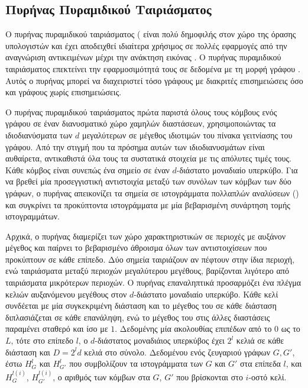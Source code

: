 \subsection{Πυρήνας Πυραμιδικού Ταιριάσματος}
\label{ssec:pm}
Ο πυρήνας πυραμιδικού ταιριάσματος ( είναι πολύ δημοφιλής στον χώρο της όρασης υπολογιστών και έχει αποδειχθεί ιδιαίτερα χρήσιμος σε πολλές εφαρμογές από την αναγνώριση αντικειμένων μέχρι την ανάκτηση εικόνας \cite{grauman2007pyramid,lazebnik2006beyond}.
Ο πυρήνας πυραμιδικού ταιριάσματος επεκτείνει την εφαρμοσιμότητά τους σε δεδομένα με τη μορφή γράφου \cite{nikolentzos2017matching}.
Αυτός ο πυρήνας μπορεί να διαχειριστεί τόσο γράφους με διακριτές επισημειώσεις όσο και γράφους χωρίς επισημειώσεις.\par
Ο πυρήνας πυραμιδικού ταιριάσματος πρώτα παριστά όλους τους κόμβους ενός γράφου σε έναν διανυσματικό χώρο χαμηλών διαστάσεων, χρησιμοποιώντας τα ιδιοδιανύσματα των $d$ μεγαλύτερων σε μέγεθος ιδιοτιμών του πίνακα γειτνίασης του γράφου.
Από την στιγμή που τα πρόσημα αυτών των ιδιοδιανυσμάτων είναι αυθαίρετα, αντικαθιστά όλα τους τα συστατικά στοιχεία με τις απόλυτες τιμές τους.
Κάθε κόμβος είναι συνεπώς ένα σημείο σε έναν $d$-διάστατο μοναδιαίο υπερκύβο.
Για να βρεθεί μία προσεγγιστική αντιστοιχία μεταξύ των συνόλων των κόμβων των δύο γράφων, ο πυρήνας απεικονίζει τα σημεία σε ιστογράμματα πολλαπλών αναλύσεων () και συγκρίνει τα προκύπτοντα ιστογράμματα με μία βεβαρισμένη συνάρτηση τομής ιστογραμμάτων.\par
Αρχικά, ο πυρήνας διαμερίζει των χώρο χαρακτηριστικών σε περιοχές με αυξάνον μέγεθος και παίρνει το βεβαρισμένο άθροισμα όλων των αντιστοιχίσεων που προκύπτουν σε κάθε επίπεδο.
Δύο σημεία ταιριάζουν αν πέφτουν στην ίδια περιοχή, ενώ ταιριάσματα μεταξύ περιοχών μεγαλύτερου μεγέθους, βαρίζονται λιγότερο από ταιριάσματα μικρότερων περιοχών.
Ο πυρήνας επαναληπτικά προσαρμόζει ένα πλέγμα κελιών αυξανόμενου μεγέθους στον $d$-διάστατο μοναδιαίο υπερκύβο.
Κάθε κελί συνδέεται με μία συγκεκριμένη διάσταση και το μέγεθος του σε κάθε διάσταση διπλασιάζεται σε κάθε επανάληψη, ενώ το μέγεθος του στις άλλες διαστάσεις παραμένει σταθερό και ίσο με $1$.
Δεδομένης μία ακολουθίας επιπέδων από το $0$ ως το $L$, τότε στο επίπεδο $l$, ο $d$-διάστατος μοναδιάιος υπερκύβος έχει $2^l$ κελιά σε κάθε διάσταση και $D = 2^{l}d$ κελιά στο σύνολο.
Δεδομένου ενός ζευγαριού γράφων $G,G'$, έστω $H_{G}^{l}$ και $H_{G'}^{l}$ που συμβολίζουν τα ιστογράμματα των $G$ και $G'$ στα επίπεδα $l$, και $H_{G}^{l(i)}$, $H_{G'}^{l(i)}$, ο αριθμός των κόμβων στα $G$, $G'$ που βρίσκονται στο $i$-οστό κελί.
